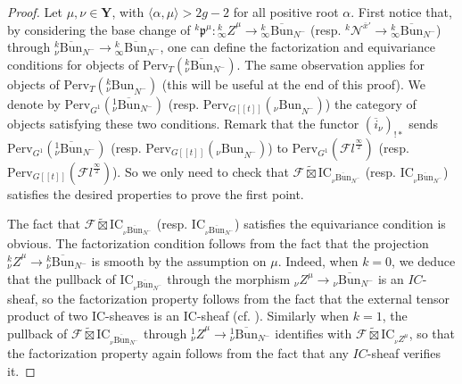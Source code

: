 \documentclass[11pt]{amsart}
\theoremstyle{plain}
\theoremstyle{remark}
\numberwithin{equation}{section}
\begin{document}
	\begin{proof}
		Let $\mu,\nu\in\mathbf{Y}$, with $\langle\alpha,\mu\rangle>2g-2$ for all positive root $\alpha$. First notice that, by considering the base change of  $^k\mathfrak{p}^\mu:{_\infty ^kZ}^\mu\to {_\infty^k\overline{\mathrm{Bun}}_{N^-}}$ (resp. $^k\mathcal{N}^{\overline{x}'}\to {_\infty^k\overline{\mathrm{Bun}}_{N^-}}$) through ${_\nu^k\overline{\mathrm{Bun}}_{N^-}}\to {_\infty^k\overline{\mathrm{Bun}}_{N^-}}$, one can define the factorization and equivariance conditions for objects of $\mathrm{Perv}_T({_\nu^k\overline{\mathrm{Bun}}_{N^-}})$. The same observation applies for objects of $\mathrm{Perv}_{T}({_\nu^k\mathrm{Bun}}_{N^-})$ (this will be useful at the end of this proof). We denote by $\mathrm{Perv}_{G^1}({_\nu^1\overline{\mathrm{Bun}}_{N^-}})$ (resp. $\mathrm{Perv}_{G[[t]]}({_\nu\mathrm{Bun}}_{N^-})$) the category of objects satisfying these two conditions. Remark that the functor $(\overline{i}_\nu)_{!*}$ sends $\mathrm{Perv}_{G^1}({_\nu^1\overline{\mathrm{Bun}}_{N^-}})$ (resp. $\mathrm{Perv}_{G[[t]]}({_\nu\mathrm{Bun}}_{N^-})$) to $\mathrm{Perv}_{G^1}(\mathcal{F}l^{\frac{\infty}{2}})$ (resp. $\mathrm{Perv}_{G[[t]]}(\mathcal{F}l^{\frac{\infty}{2}})$). So we only need to check that  $\mathcal{F}\widetilde{\boxtimes}\mathrm{IC}_{_{\nu}\overline{\mathrm{Bun}}_{N^-}}$ (resp. $\mathrm{IC}_{_{\nu}\overline{\mathrm{Bun}}_{N^-}}$) satisfies the desired properties to prove the first point.
		
		The fact that $\mathcal{F}\widetilde{\boxtimes}\mathrm{IC}_{_{\nu}\overline{\mathrm{Bun}}_{N^-}}$ (resp. $\mathrm{IC}_{_{\nu}\overline{\mathrm{Bun}}_{N^-}}$) satisfies the equivariance condition is obvious. The factorization condition follows from the fact that the projection ${_\nu ^kZ}^\mu\to {_\nu^k\overline{\mathrm{Bun}}_{N^-}}$ is smooth by the assumption on $\mu$. Indeed, when $k=0$, we deduce that the pullback of  $\mathrm{IC}_{_{\nu}\overline{\mathrm{Bun}}_{N^-}}$ through the morphism ${_\nu Z}^\mu\to {_\nu\overline{\mathrm{Bun}}_{N^-}}$ is an $IC$-sheaf, so the factorization property follows from the fact that the external tensor product of two IC-sheaves is an IC-sheaf (cf. \cite[Lemma 3.3.14]{achar2021perverse}). Similarly when $k=1$, the pullback of $\mathcal{F}\widetilde{\boxtimes}\mathrm{IC}_{_{\nu}\overline{\mathrm{Bun}}_{N^-}}$ through ${_\nu ^1Z}^\mu\to {_\nu^1\overline{\mathrm{Bun}}_{N^-}}$ identifies with $\mathcal{F}\widetilde{\boxtimes}\mathrm{IC}_{{_\nu Z}^\mu}$, so that the factorization property again follows from the fact that any $IC$-sheaf verifies it.
		

\end{proof}
\end{document}
